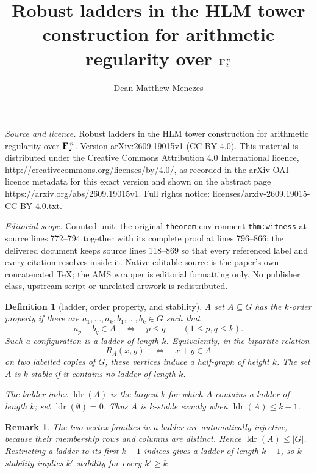 \documentclass[10pt,a4paper]{amsart}
\newtheorem{definition}[theorem]{Definition}
\newtheorem{remark}[theorem]{Remark}
\numberwithin{theorem}{section}
\newcommand{\abs}[1]{\lvert #1\rvert}
\newcommand{\ldr}{\operatorname{ldr}}
\begin{document}
\title[Robust ladders in the HLM tower construction for arithmetic ]{Robust ladders in the HLM tower construction for arithmetic regularity over ${\bf F}_2^{\,n}$}
\author{Dean Matthew Menezes}
\date{}
\maketitle
\noindent\emph{Source and licence.} Robust ladders in the HLM tower construction for arithmetic regularity over ${\bf F}_2^{\,n}$. Version arXiv:2609.19015v1 (CC BY 4.0). This material is distributed under the Creative Commons Attribution 4.0 International licence, http://creativecommons.org/licenses/by/4.0/, as recorded in the arXiv OAI licence metadata for this exact version and shown on the abstract page https://arxiv.org/abs/2609.19015v1. Full rights notice: licenses/arxiv-2609.19015-CC-BY-4.0.txt.\par\smallskip
\noindent\textit{Editorial scope.} Counted unit: the original \texttt{theorem} environment \texttt{thm:witness} at source lines 772--794 together with its complete proof at lines 796--866; the delivered document keeps source lines 118--869 so that every referenced label and every citation resolves inside it. Native editable source is the paper's own concatenated TeX; the AMS wrapper is editorial formatting only. No publisher class, upstream script or unrelated artwork is redistributed.
\begin{definition}[ladder, order property, and stability]\label{def:op}
A set $A\subseteq G$ has the \emph{$k$-order property} if there are
$a_1,\dots,a_k,b_1,\dots,b_k\in G$ such that
\[
  a_p+b_q\in A\quad\Longleftrightarrow\quad p\le q
  \qquad(1\le p,q\le k).
\]
Such a configuration is a \emph{ladder of length $k$}.  Equivalently, in
the bipartite relation
\[
  R_A(x,y)\quad\Longleftrightarrow\quad x+y\in A
\]
on two labelled copies of $G$, these vertices induce a half-graph of
height $k$.  The set $A$ is \emph{$k$-stable} if it contains no ladder of
length $k$.

The \emph{ladder index} $\ldr(A)$ is the largest $k$ for which $A$
contains a ladder of length $k$; set $\ldr(\emptyset)=0$.  Thus $A$ is
$k$-stable exactly when $\ldr(A)\le k-1$.
\end{definition}

\begin{remark}\label{rem:ladder-bookkeeping}
The two vertex families in a ladder are automatically injective, because
their membership rows and columns are distinct.  Hence
$\ldr(A)\le\abs G$.  Restricting a ladder to its first $k-1$ indices gives
a ladder of length $k-1$, so $k$-stability implies $k'$-stability for every
$k'\ge k$.
\end{remark}
\end{document}
